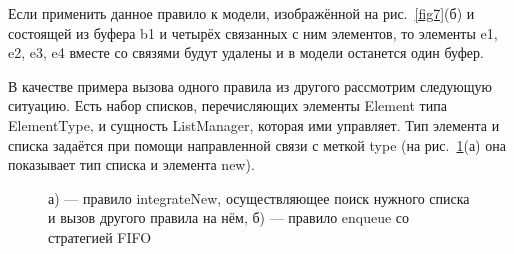 \documentclass[a5paper]{article}
\begin{document}
Если применить данное правило к модели, изображённой на рис.~\ref{fig7}(б) и состоящей из буфера b1 и четырёх связанных с ним элементов, то элементы e1, e2, e3, e4 вместе со связями будут удалены и в модели останется один буфер.

В качестве примера вызова одного правила из другого рассмотрим следующую ситуацию. Есть набор списков, перечисляющих элементы Element типа ElementType, и сущность ListManager, которая ими управляет. Тип элемента и списка задаётся при помощи направленной связи с меткой type (на рис.~\ref{fig8}(а) она показывает тип списка и элемента new).

\begin{figure}[h]
\begin{center}
\begin{minipage}[h]{0.8\linewidth}
\end{minipage}
\begin{minipage}[h]{0.8\linewidth}
\end{minipage}
\end{center}
\caption{а) — правило integrateNew, осуществляющее поиск нужного списка и вызов другого правила на нём, б) — правило enqueue со стратегией FIFO}
\label{fig8}
\end{figure}
\end{document}
